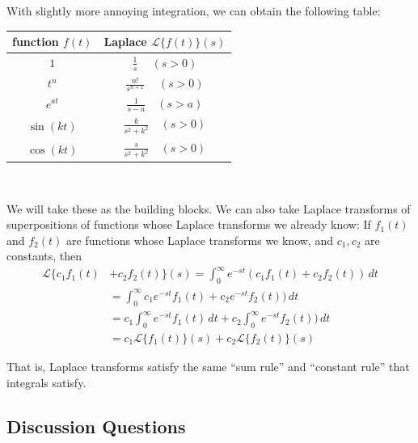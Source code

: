\documentclass[12pt]{amsart}
\numberwithin{equation}{section}
\theoremstyle{plain} %
\theoremstyle{definition}
\theoremstyle{remark}
\newcommand{\LA}[1]{\mathcal{L}\{ #1 \}}
\begin{document}
With slightly more annoying integration, we can obtain the following table:
\begin{center}
\begin{tabular}{|c|c|}
 \hline
function $f(t)$ & Laplace $\LA{f(t)}(s)$\\
  \hline
$1$ &$ \displaystyle\frac{1}{s} \quad \ (s>0)$
 \\  \hline
 $t^n$ & $ \displaystyle\frac{n!}{s^{n+1}} \quad \ (s>0)$
 \\  \hline
  $e^{at}$ & $ \displaystyle\frac{1}{s-a} \quad (s>a)$
 \\  \hline
  $\sin(kt)$ & $ \displaystyle\frac{k}{s^2 + k^2} \quad (s>0)$
 \\  \hline
   $\cos(kt)$ & $ \displaystyle\frac{s}{s^2 + k^2} \quad (s>0)$
 \\  \hline
\end{tabular}
\end{center}

\

We will take these as the building blocks. We can also take Laplace transforms of superpositions of functions whose Laplace transforms we already know: 
If $f_1(t)$ and $f_2(t)$ are functions whose Laplace transforms we know, and $c_1, c_2$ are constants, then
\begin{align*} \LA{c_1 f_1(t) &+ c_2 f_2(t)}(s) = \int_0^\infty e^{-st} (c_1 f_1(t) + c_2 f_2(t))\, dt \\&= \int_0^\infty c_1 e^{-st}  f_1(t) + c_2 e^{-st}f_2(t))\, dt \\&= 
c_1 \int_0^\infty  e^{-st}  f_1(t) \, dt + c_2  \int_0^\infty  e^{-st}f_2(t))\, dt \\&= c_1 \LA{f_1(t)}(s) + c_2 \LA{f_2(t)} (s)\end{align*}

That is, Laplace transforms satisfy the same ``sum rule'' and ``constant rule'' that integrals satisfy.



\subsection*{Discussion Questions}
\end{document}
